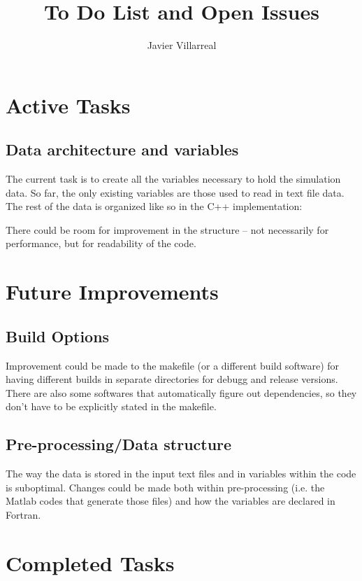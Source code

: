 \documentclass[12pt]{article}
\begin{document}
    \title{To Do List and Open Issues}
    \author{Javier Villarreal}
    \date{}
    \maketitle

    \section{Active Tasks}

    \subsection{Data architecture and variables}
        The current task is to create all the variables necessary to hold the simulation data. So far, the only existing variables are those used to read in text file data. The rest of the data is organized like so in the C++ implementation:

    
        There could be room for improvement in the structure -- not necessarily for performance, but for readability of the code.
    
    \newpage
    \section{Future Improvements}
    \subsection{Build Options}
    Improvement could be made to the makefile (or a different build software) for having different builds in separate directories for debugg and release versions. There are also some softwares that automatically figure out dependencies, so they don't have to be explicitly stated in the makefile.

    \subsection{Pre-processing/Data structure}
    The way the data is stored in the input text files and in variables within the code is suboptimal. Changes could be made both within pre-processing (i.e. the Matlab codes that generate those files) and how the variables are declared in Fortran.

    \newpage
    \section{Completed Tasks}
\end{document}
